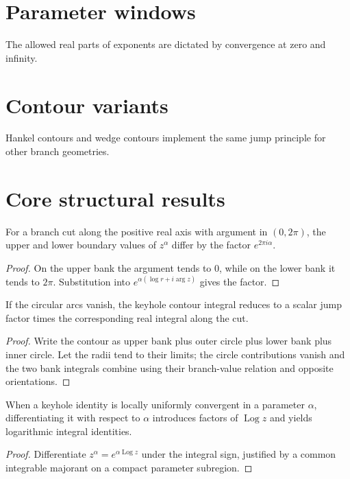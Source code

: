 \section{Parameter windows}
The allowed real parts of exponents are dictated by convergence at zero and infinity.

\section{Contour variants}
Hankel contours and wedge contours implement the same jump principle for other branch geometries.

\section{Core structural results}

\begin{theorem}\label{thm:iv21-01}
For a branch cut along the positive real axis with argument in $(0,2\pi)$, the upper and lower boundary values of $z^\alpha$ differ by the factor $e^{2\pi i\alpha}$.
\begin{proof}
On the upper bank the argument tends to $0$, while on the lower bank it tends to $2\pi$. Substitution into $e^{\alpha(\log r+i\arg z)}$ gives the factor.
\end{proof}
\end{theorem}

\begin{theorem}\label{thm:iv21-02}
If the circular arcs vanish, the keyhole contour integral reduces to a scalar jump factor times the corresponding real integral along the cut.
\begin{proof}
Write the contour as upper bank plus outer circle plus lower bank plus inner circle. Let the radii tend to their limits; the circle contributions vanish and the two bank integrals combine using their branch-value relation and opposite orientations.
\end{proof}
\end{theorem}

\begin{theorem}\label{thm:iv21-03}
When a keyhole identity is locally uniformly convergent in a parameter $\alpha$, differentiating it with respect to $\alpha$ introduces factors of $\operatorname{Log} z$ and yields logarithmic integral identities.
\begin{proof}
Differentiate $z^\alpha=e^{\alpha\operatorname{Log} z}$ under the integral sign, justified by a common integrable majorant on a compact parameter subregion.
\end{proof}
\end{theorem}

